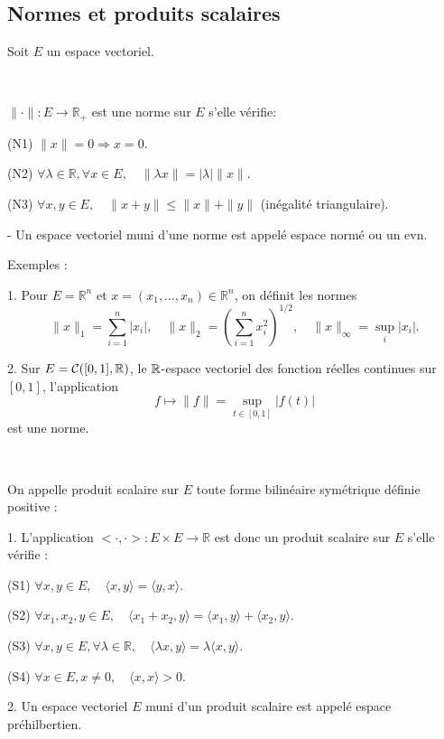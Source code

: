 \subsection{ Normes et produits scalaires}
Soit $E$ un espace vectoriel.
\begin{definition}\
	
	$\|\cdot\|: E \rightarrow \mathbb{R}_{+}$ est une norme sur $E$ s'elle vérifie:
	
(N1) $\|x\|=0\Longrightarrow x=0$.

(N2) $\forall \lambda \in \mathbb{R}, \forall x \in E, \quad\|\lambda x\|=|\lambda|\|x\|$.

(N3) $\forall x, y \in E, \quad\|x+y\| \leq\|x\|+\|y\|$
(inégalité triangulaire).


- Un espace vectoriel muni d'une norme est appelé espace normé ou un evn.


\end{definition}
Exemples : 

1. Pour $E=\mathbb{R}^{n}$ et $x=\left(x_{1}, \ldots, x_{n}\right) \in \mathbb{R}^{n}$, on définit les normes
$$
\|x\|_{1}=\sum_{i=1}^{n}\left|x_{i}\right|,  \quad\|x\|_{2}=\left(\sum_{i=1}^{n} x_{i}^{2}\right)^{1 / 2},    \quad\|x\|_{\infty}=\sup _{i}\left|x_{i}\right|.
$$

2. Sur $E=\mathcal{C}([0,1], \mathbb R)$, le $\mathbb R$-espace vectoriel des fonction réelles continues sur $[0,1]$,  l'application 
$$
f\longmapsto\|f\|=\sup_{t\in[0,1]}|f(t)|
$$
est une  norme.



\begin{definition}\
	
On appelle produit scalaire sur $E$ toute forme bilinéaire symétrique définie positive : 

1. \; L'application $<\cdot, \cdot >: E \times E \rightarrow \mathbb{R}$ est donc un produit scalaire sur $E$ s'elle   vérifie :

(S1) $\forall x, y \in E, \quad\langle x, y\rangle =\langle y, x\rangle $.

(S2) $\forall x_{1}, x_{2}, y \in E, \quad\langle x_{1}+x_{2}, y\rangle =\langle x_{1}, y\rangle +\langle x_{2}, y\rangle $.

(S3) $\forall x, y \in E, \forall \lambda \in \mathbb{R}, \quad\langle \lambda x, y\rangle =\lambda\langle x, y\rangle $.

(S4) $\forall x \in E, x \neq 0, \quad\langle x, x\rangle >0$.


2.\; Un espace vectoriel $E$ muni d'un produit scalaire est appelé espace préhilbertien. 
\end{definition}

